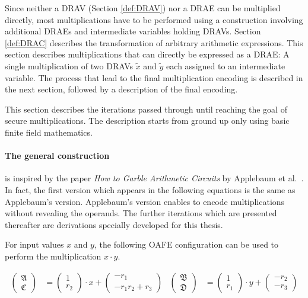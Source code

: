 \label{sec:enc-muls}

Since neither a DRAV (Section \ref{def:DRAV}) nor a DRAE can be multiplied
directly, most multiplications have to be performed using a construction
involving additional DRAEs and intermediate variables holding DRAVs. Section
\ref{def:DRAC} describes the transformation of arbitrary arithmetic expressions.
This section describes multiplications that can directly be expressed as a DRAE:
A single multiplication of two DRAVs $\widetilde{x}$ and $\widetilde{y}$ each
assigned to an intermediate variable. The process that lead to the final
multiplication encoding is described in the next section, followed by a
description of the final encoding.


\label{sec:toward-sec-muls}

This section describes the iterations passed through until reaching the goal of
secure multiplications. The description starts from ground up only using basic
finite field mathematics.

\paragraph{The general construction} is inspired by the paper \emph{How to
Garble Arithmetic Circuits} by Applebaum et al.\ \cite{gac2012}. In fact, the
first version which appears in the following equations is the same as
Applebaum's version. Applebaum's version enables to encode multiplications
without revealing the operands. The further iterations which are presented
thereafter are derivations specially developed for this thesis.

For input values $x$ and $y$, the following OAFE configuration can be used to
perform the multiplication $x \cdot y$.

\begin{align*}
\begin{pmatrix}\mathfrak{A}\\\mathfrak{C}\end{pmatrix} & =
\begin{pmatrix}1\\r_2\end{pmatrix} \cdot x +
\begin{pmatrix}-r_1\\-r_1r_2+r_3\end{pmatrix} &
\begin{pmatrix}\mathfrak{B}\\\mathfrak{D}\end{pmatrix} & =
\begin{pmatrix}1\\r_1\end{pmatrix} \cdot y +
\begin{pmatrix}-r_2\\-r_3\end{pmatrix}\\
\end{align*}

